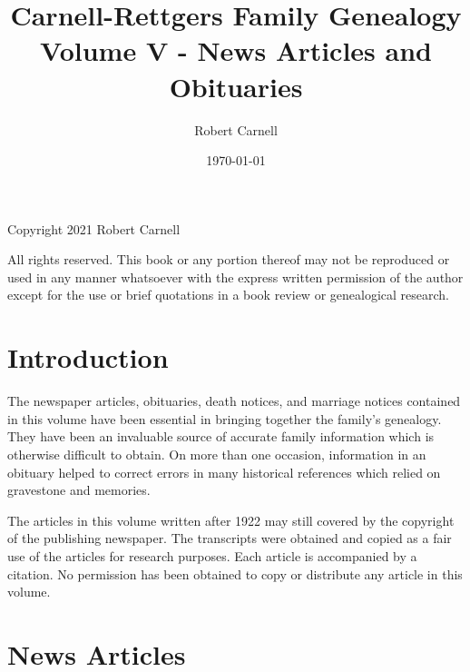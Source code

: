\documentclass[11pt,letter]{book}
\title{\bf Carnell-Rettgers Family Genealogy \\
       \large Volume V - News Articles and Obituaries}
\author{Robert Carnell}
\date{\today}
\begin{document}
\frontmatter
\maketitle
\clearpage

\begingroup
\parindent 0pt
\parskip
\baselineskip
Copyright \textcopyright{} 2021 Robert Carnell

All rights reserved.  This book or any portion thereof may not be reproduced or used in any manner whatsoever with the express written permission of the author except for the use or brief quotations in a book review or genealogical research.
\endgroup
\clearpage

\tableofcontents
\mainmatter

\chapter{Introduction}

The newspaper articles, obituaries, death notices, and marriage notices contained in this volume have been essential in bringing together the family's genealogy.  They have been an invaluable source of accurate family information which is otherwise difficult to obtain.  On more than one occasion, information in an obituary helped to correct errors in many historical references which relied on gravestone and memories.

The articles in this volume written after 1922 may still covered by the copyright of the publishing newspaper.  The transcripts were obtained and copied as a fair use of the articles for research purposes.  Each article is accompanied by a citation.  No permission has been obtained to copy or distribute any article in this volume.

\chapter{News Articles}
\renewcommand{\thesection}{\arabic{section}}


\end{document}

